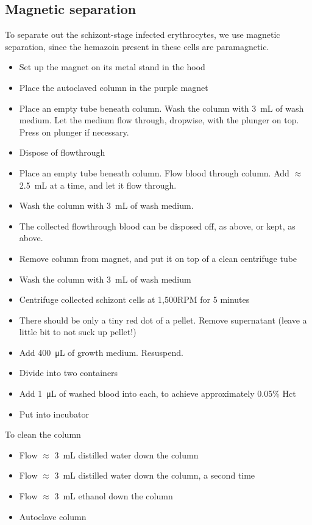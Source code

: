 \documentclass{article}
\begin{document}
\subsection{Magnetic separation}

To separate out the schizont-stage infected erythrocytes, we use magnetic separation, since the hemazoin present in these cells are paramagnetic.\\

\begin{itemize}
	\item Set up the magnet on its metal stand in the hood
	\item Place the autoclaved column in the purple magnet
	\item Place an empty tube beneath column. Wash the column with \SI{3}{mL} of wash medium. Let the medium flow through, dropwise, with the plunger on top. Press on plunger if necessary.
	\item Dispose of flowthrough
	\item Place an empty tube beneath column. Flow blood through column. Add $\approx$ \SI{2.5}{mL} at a time, and let it flow through.
	\item Wash the column with \SI{3}{mL} of wash medium.
	\item The collected flowthrough blood can be disposed off, as above, or kept, as above.
	\item Remove column from magnet, and put it on top of a clean centrifuge tube
	\item Wash the column with \SI{3}{mL} of wash medium
	\item Centrifuge collected schizont cells at 1,500RPM for 5 minutes
	\item There should be only a tiny red dot of a pellet. Remove supernatant (leave a little bit to not suck up pellet!)
	\item Add \SI{400}{\micro\liter} of growth medium. Resuspend.
	\item Divide into two containers
	\item Add \SI{1}{\micro\liter} of washed blood into each, to achieve approximately 0.05\% Hct
	\item Put into incubator
\end{itemize}

To clean the column

\begin{itemize}
	\item Flow $\approx$ \SI{3}{mL} distilled water down the column
	\item Flow $\approx$ \SI{3}{mL} distilled water down the column, a second time
	\item Flow $\approx$ \SI{3}{mL} ethanol down the column
	\item Autoclave column
\end{itemize}
\end{document}
